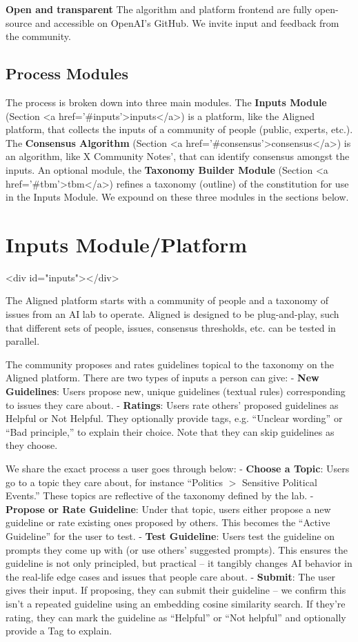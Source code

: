 \documentclass{article}
\begin{document}
\begin{multicols}{2}
\textbf{Open and transparent}
The algorithm and platform frontend are fully open-source and accessible on OpenAI’s GitHub. We invite input and feedback from the community.

\subsection{Process Modules}

The process is broken down into three main modules. The \textbf{Inputs Module} (Section <a href='#inputs'>inputs</a>) is a platform, like the Aligned platform, that collects the inputs of a community of people (public, experts, etc.). The \textbf{Consensus Algorithm} (Section <a href='#consensus'>consensus</a>) is an algorithm, like X Community Notes', that can identify consensus amongst the inputs. An optional module, the \textbf{Taxonomy Builder Module} (Section <a href='#tbm'>tbm</a>) refines a taxonomy (outline) of the constitution for use in the Inputs Module. We expound on these three modules in the sections below.

\section{Inputs Module/Platform} <div id="inputs"></div>


The Aligned platform starts with a community of people and a taxonomy of issues from an AI lab to operate. Aligned is designed to be plug-and-play, such that different sets of people, issues, consensus thresholds, etc. can be tested in parallel.

The community proposes and rates guidelines topical to the taxonomy on the Aligned platform. There are two types of inputs a person can give:
-  \textbf{New Guidelines}: Users propose new, unique guidelines (textual rules) corresponding to issues they care about.
-  \textbf{Ratings}: Users rate others’ proposed guidelines as Helpful or Not Helpful. They optionally provide tags, e.g. “Unclear wording” or “Bad principle,” to explain their choice. Note that they can skip guidelines as they choose.

We share the exact process a user goes through below:
-  \textbf{Choose a Topic}: Users go to a topic they care about, for instance “Politics $>$ Sensitive Political Events.” These topics are reflective of the taxonomy defined by the lab.
-  \textbf{Propose or Rate Guideline}: Under that topic, users either propose a new guideline or rate existing ones proposed by others. This becomes the “Active Guideline” for the user to test.
-  \textbf{Test Guideline}: Users test the guideline on prompts they come up with (or use others’ suggested prompts). This ensures the guideline is not only principled, but practical – it tangibly changes AI behavior in the real-life edge cases and issues that people care about.
-  \textbf{Submit}: The user gives their input. If proposing, they can submit their guideline -- we confirm this isn't a repeated guideline using an embedding cosine similarity search. If they’re rating, they can mark the guideline as “Helpful” or “Not helpful” and optionally provide a Tag to explain.


\end{multicols}
\end{document}
